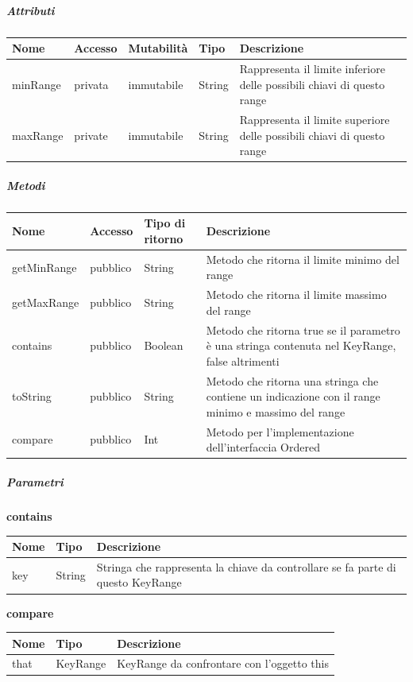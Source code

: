 \documentclass{scalatekids-article}
\begin{document}
\subparagraph{Attributi}
\begin{tabular}{| p{3cm} | p{1.5cm} | p{2cm} | p{2cm} | p{8.5cm} |}
  \hline
  Nome & Accesso & Mutabilità & Tipo & Descrizione\\
  \hline
  minRange & privata & immutabile & String & Rappresenta il limite inferiore delle possibili chiavi di questo range \\
  \hline
  maxRange & private & immutabile & String & Rappresenta il limite superiore delle possibili chiavi di questo range \\
  \hline
\end{tabular}

\subparagraph{Metodi}
\begin{tabular}{| p{3cm} | p{1.5cm} | p{3.5cm} | p{9cm} |}
  \hline
  Nome & Accesso & Tipo di ritorno & Descrizione\\
  \hline
  getMinRange & pubblico & String & Metodo che ritorna il limite minimo del range \\
  \hline
  getMaxRange & pubblico & String & Metodo che ritorna il limite massimo del range \\
  \hline
  contains & pubblico & Boolean & Metodo che ritorna true se il parametro è una stringa contenuta nel KeyRange, false altrimenti\\
  \hline
  toString & pubblico & String & Metodo che ritorna una stringa che contiene un indicazione con il range minimo e massimo del range\\
  \hline
  compare & pubblico & Int & Metodo per l'implementazione dell'interfaccia Ordered\\
  \hline
\end{tabular}

\subparagraph{Parametri}
\begin{center}
  \textbf{contains}\\
\end{center}
\begin{tabular}{| l | l | l |}
  \hline
  Nome & Tipo & Descrizione\\
  \hline
  key & String & Stringa che rappresenta la chiave da controllare se fa parte di questo KeyRange \\
  \hline
\end{tabular}

\begin{center}
  \textbf{compare}\\
\end{center}
\begin{tabular}{| l | l | l |}
  \hline
  Nome & Tipo & Descrizione\\
  \hline
  that & KeyRange & KeyRange da confrontare con l'oggetto this \\
  \hline
\end{tabular}
\end{document}
